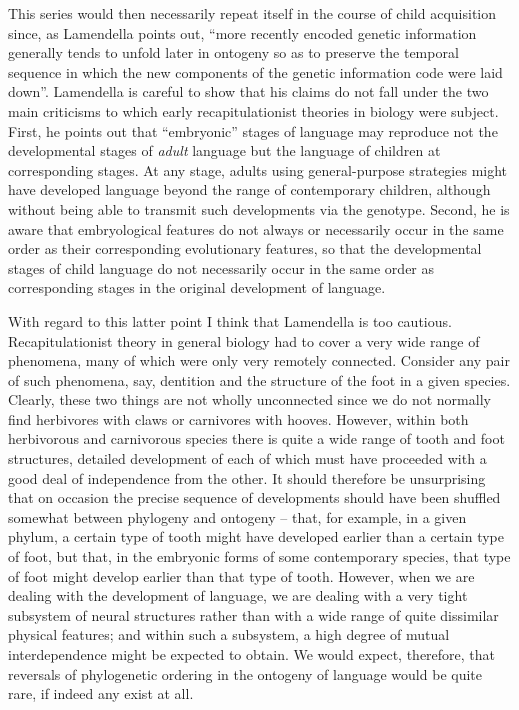 This series would then necessarily repeat itself in the course of child acquisition since, as Lamendella points out, ``more recently encoded genetic information generally tends to unfold later in ontogeny so as to preserve the temporal sequence in which the new components of the genetic information code were laid down''. Lamendella is careful to show that his claims do not fall under the two main criticisms to which early recapitulationist theories in biology were subject. First, he points out that ``embryonic'' stages of language may reproduce not the developmental stages of \textit{adult} language but the language of children at corresponding stages. At any stage, adults using general-purpose strategies might have developed language beyond the range of contemporary children, although without being able to transmit such developments via the genotype. Second, he is aware that embryological features do not always or necessarily occur in the same order as their corresponding evolutionary features, so that the developmental stages of child language do not necessarily occur in the same order as corre\-sponding stages in the original development of language.

With regard to this latter point I think that Lamendella is too cautious. Recapitulationist theory in general biology had to cover a very wide range of phenomena, many of which were only very re\-motely connected. Consider any pair of such phenomena, say, dentition and the structure of the foot in a given species. Clearly, these two things are not wholly unconnected since we do not normally find herbivores with claws or carnivores with hooves. However, within both herbivorous and carnivorous species there is quite a wide range of tooth and foot structures, detailed development of each of which must have proceeded with a good deal of independence from the other. It should therefore be unsurprising that on occasion the precise sequence of developments should have been shuffled somewhat between phylogeny and ontogeny -- that, for example, in a given phylum, a certain type of tooth might have developed earlier than a certain type of foot, but that, in the embryonic forms of some contemporary species, that type
of foot might develop earlier than that type of tooth. However, when we are dealing with the development of language, we are dealing with a very tight subsystem of neural structures rather than with a wide range of quite dissimilar physical features; and within such a sub\-system, a high degree of mutual interdependence might be expected to obtain. We would expect, therefore, that reversals of phylogenetic ordering in the ontogeny of language would be quite rare, if indeed any exist at all.

